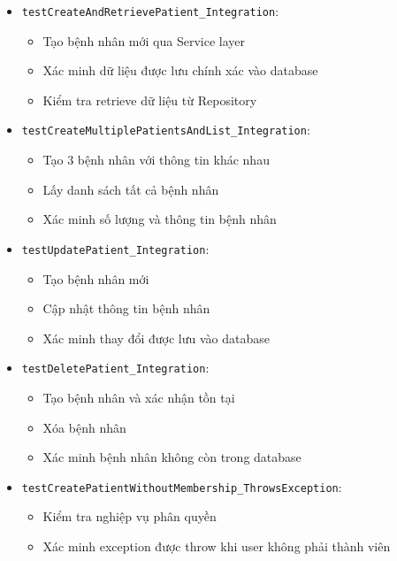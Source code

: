 \begin{itemize}
    \item \texttt{testCreateAndRetrievePatient\_Integration}: 
    \begin{itemize}
        \item Tạo bệnh nhân mới qua Service layer
        \item Xác minh dữ liệu được lưu chính xác vào database
        \item Kiểm tra retrieve dữ liệu từ Repository
    \end{itemize}
    
    \item \texttt{testCreateMultiplePatientsAndList\_Integration}:
    \begin{itemize}
        \item Tạo 3 bệnh nhân với thông tin khác nhau
        \item Lấy danh sách tất cả bệnh nhân
        \item Xác minh số lượng và thông tin bệnh nhân
    \end{itemize}
    
    \item \texttt{testUpdatePatient\_Integration}:
    \begin{itemize}
        \item Tạo bệnh nhân mới
        \item Cập nhật thông tin bệnh nhân
        \item Xác minh thay đổi được lưu vào database
    \end{itemize}
    
    \item \texttt{testDeletePatient\_Integration}:
    \begin{itemize}
        \item Tạo bệnh nhân và xác nhận tồn tại
        \item Xóa bệnh nhân
        \item Xác minh bệnh nhân không còn trong database
    \end{itemize}
    
    \item \texttt{testCreatePatientWithoutMembership\_ThrowsException}:
    \begin{itemize}
        \item Kiểm tra nghiệp vụ phân quyền
        \item Xác minh exception được throw khi user không phải thành viên
    \end{itemize}
\end{itemize}

